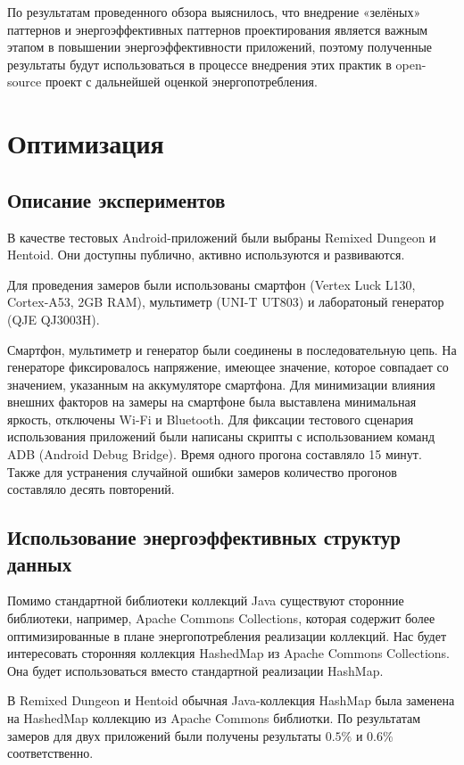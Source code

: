 \documentclass{math-mech-sci}
\begin{document}
        По результатам проведенного обзора выяснилось, что внедрение «зелёных» паттернов и энергоэффективных паттернов проектирования является важным этапом в повышении энергоэффективности приложений, поэтому полученные результаты будут использоваться в процессе внедрения этих практик в open-source проект с дальнейшей оценкой энергопотребления.


\section{Оптимизация}
    \subsection{Описание экспериментов}
        В качестве тестовых Android-приложений были выбраны Remixed Dungeon\cite{remixeddungeon} и Hentoid\cite{hentoid}. Они доступны публично, активно используются и развиваются.

        Для проведения замеров были использованы смартфон (Vertex Luck L130, Cortex-A53, 2GB RAM), мультиметр (UNI-T UT803) и лаборатоный генератор (QJE QJ3003H).

        Смартфон, мультиметр и генератор были соединены в последовательную цепь. На генераторе фиксировалось напряжение, имеющее значение, которое совпадает со значением, указанным на аккумуляторе смартфона. Для минимизации влияния внешних факторов на замеры на смартфоне была выставлена минимальная яркость, отключены Wi-Fi и Bluetooth. Для фиксации тестового сценария использования приложений были написаны скрипты с использованием команд ADB (Android Debug Bridge). Время одного прогона составляло 15 минут. Также для устранения случайной ошибки замеров количество прогонов составляло десять повторений.

    \subsection{Использование энергоэффективных структур данных}
        Помимо стандартной библиотеки коллекций Java существуют сторонние библиотеки, например, Apache Commons Collections\cite{apachecommons}, которая содержит более оптимизированные в плане энергопотребления реализации коллекций. Нас будет интересовать сторонняя коллекция HashedMap из Apache Commons Collections. Она будет использоваться вместо стандартной реализации HashMap.

        В Remixed Dungeon и Hentoid обычная Java-коллекция HashMap была заменена на HashedMap коллекцию из Apache Commons библиотки. По результатам замеров для двух приложений были получены результаты $0.5\%$ и $0.6\%$ соответственно.
\end{document}
